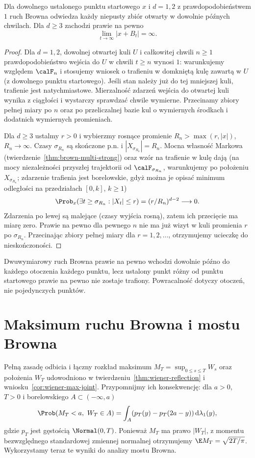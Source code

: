 \begin{twierdzenie}
Dla dowolnego ustalonego punktu startowego $x$
i $d=1,2$ z prawdopodobieństwem $1$ ruch Browna
odwiedza każdy niepusty zbiór otwarty w dowolnie
późnych chwilach. Dla $d\ge3$ zachodzi prawie na pewno
\[
\lim_{t\to\infty}|x+B_t|=\infty.
\]
\end{twierdzenie}
\begin{proof}
Dla $d=1,2$, dowolnej otwartej kuli $U$
i całkowitej chwili $n\ge1$ prawdopodobieństwo
wejścia do $U$ w chwili $t\ge n$ wynosi $1$:
warunkujemy względem $\calF_n$ i stosujemy wniosek
o trafieniu w domkniętą kulę zawartą w $U$
(z dowolnego punktu startowego). Jeśli stan należy
już do tej mniejszej kuli, trafienie jest natychmiastowe.
Mierzalność zdarzeń wejścia do otwartej kuli wynika
z ciągłości i wystarczy sprawdzać chwile wymierne.
Przecinamy zbiory pełnej miary po $n$ oraz
po przeliczalnej bazie kul o wymiernych środkach
i dodatnich wymiernych promieniach.

Dla $d\ge3$ ustalmy $r>0$ i wybierzmy rosnące
promienie $R_n>\max(r,|x|)$, $R_n\to\infty$.
Czasy $\sigma_{R_n}$ są skończone p.n. i
$|X_{\sigma_{R_n}}|=R_n$.
Mocna własność Markowa
(twierdzenie~\ref{thm:brown-multi-strong}) oraz
wzór na trafienie w kulę dają (na mocy niezależności
przyszłej trajektorii od $\calF_{\sigma_{R_n}}$,
warunkujemy po położeniu $X_{\sigma_{R_n}}$;
zdarzenie trafienia jest borelowskie, gdyż można
je opisać minimum odległości na przedziałach
$[0,k]$, $k\ge1$)
\[
\Prob_x(\exists t\ge\sigma_{R_n}:|X_t|\le r)
=(r/R_n)^{d-2}\longrightarrow0.
\]
Zdarzenia po lewej są malejące (czasy wyjścia
rosną), zatem ich przecięcie ma miarę zero.
Prawie na pewno dla pewnego $n$ nie ma już
wizyt w kuli promienia $r$ po $\sigma_{R_n}$.
Przecinając zbiory pełnej miary dla $r=1,2,\ldots$,
otrzymujemy ucieczkę do nieskończoności.
\end{proof}

\begin{uwaga}
Dwuwymiarowy ruch Browna prawie na pewno wchodzi
dowolnie późno do każdego otoczenia każdego punktu,
lecz ustalony punkt różny od punktu startowego
prawie na pewno nie zostaje trafiony.
Powracalność dotyczy otoczeń, nie pojedynczych punktów.
\end{uwaga}

\section{Maksimum ruchu Browna i mostu Browna}
Pełną zasadę odbicia i łączny rozkład maksimum
$M_T=\sup_{0\le s\le T}W_s$ oraz położenia $W_T$
udowodniono w twierdzeniu~\ref{thm:wiener-reflection}
i wniosku~\ref{cor:wiener-max-joint}.
Przypomnijmy ich konsekwencję: dla $a>0$, $T>0$ i
borelowskiego $A\subset(-\infty,a)$
\[
\Prob(M_T<a,\ W_T\in A)
=\int_A(p_T(y)-p_T(2a-y))\,\mathrm d\lambda_1(y),
\]
gdzie $p_T$ jest gęstością $\Normal(0,T)$.
Ponieważ $M_T$ ma prawo $|W_T|$, z momentu bezwzględnego
standardowej zmiennej normalnej otrzymujemy
$\E M_T=\sqrt{2T/\pi}$.
Wykorzystamy teraz te wyniki do analizy mostu Browna.

